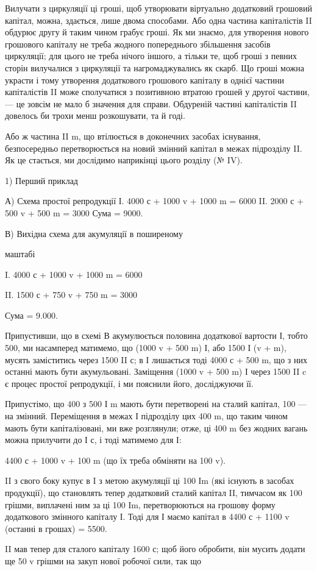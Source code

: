 Вилучати з циркуляції ці гроші, щоб утворювати віртуально додатковий
грошовий капітал, можна, здається, лише двома способами. Або
одна частина капіталістів II обдурює другу й таким чином грабує гроші.
Як ми знаємо, для утворення нового грошового капіталу не треба жодного
попереднього збільшення засобів циркуляції; для цього не треба
нічого іншого, а тільки те, щоб гроші з певних сторін вилучалися з
циркуляції та нагромаджувались як скарб. Що гроші можна украсти і
тому утворення додаткового грошового капіталу в однієї частини капіталістів
II може сполучатися з позитивною втратою грошей у другої частини,
— це зовсім не мало б значення для справи. Обдуреній частині
капіталістів II довелось би трохи менш розкошувати, та й годі.

Або ж частина II m, що втілюється в доконечних засобах існування,
безпосередньо перетворюється на новий змінний капітал в межах підрозділу
II. Як це стається, ми дослідимо наприкінці цього розділу
(№ IV).

1) Перший приклад

А) Схема простої репродукції
І. 4000 с + 1000 v + 1000 m = 6000
II. 2000 с + 500 v + 500 m = 3000
Сума = 9000.

В) Вихідна схема для акумуляції в поширеному

маштабі

I. 4000 с + 1000 v + 1000 m = 6000

II. 1500 с + 750 v + 750 m = 3000

Сума = 9.000.

Припустивши, що в схемі В акумулюється половина додаткової вартости
І, тобто 500, ми насамперед матимемо, що (1000 v + 500 m) І,
або 1500 І (v + m), мусять заміститись через 1500 II с; в І лишається
тоді 4000 с + 500 m, що з них останні мають бути акумульовані.
Заміщення (1000 v + 500 m) І через 1500 II c є процес простої репродукції,
і ми пояснили його, досліджуючи її.

Припустімо, що 400 з 500 І m мають бути перетворені на сталий
капітал, 100 — на змінний. Переміщення в межах І підрозділу цих 400 m,
що таким чином мають бути капіталізовані, ми вже розглянули; отже,
ці 400 m без жодних вагань можна прилучити до І с, і тоді матимемо
для І:

4400 с + 1000 v + 100 m (що їх треба обміняти на 100 v).

II з свого боку купує в I з метою акумуляції ці 100 Іm (які існують
в засобах продукції), що становлять тепер додатковий сталий капітал II,
тимчасом як 100 грішми, виплачені ним за ці 100 Іm, перетворюються
на грошову форму додаткового змінного капіталу І. Тоді для І маємо
капітал в 4400 с + 1100 v (останні в грошах) = 5500.

II мав тепер для сталого капіталу 1600 с; щоб його обробити, він
мусить додати ще 50 v грішми на закуп нової робочої сили, так що
\parbreak{}  %
